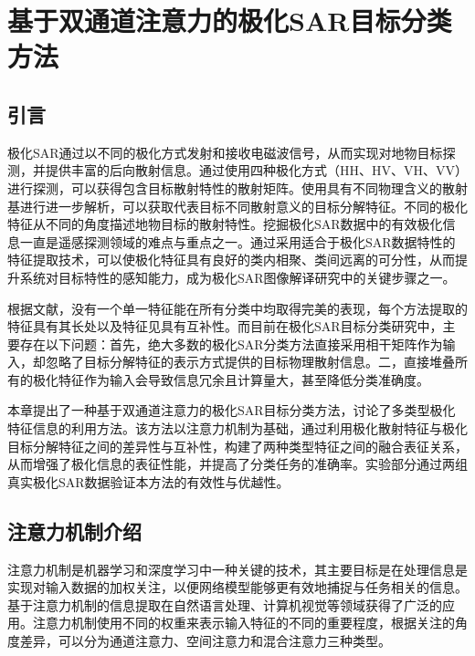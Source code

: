 \chapter{基于双通道注意力的极化SAR目标分类方法}
\section{引言}
极化SAR通过以不同的极化方式发射和接收电磁波信号，从而实现对地物目标探测，并提供丰富的后向散射信息。通过使用四种极化方式（HH、HV、VH、VV）进行探测，可以获得包含目标散射特性的散射矩阵。使用具有不同物理含义的散射基进行进一步解析，可以获取代表目标不同散射意义的目标分解特征。不同的极化特征从不同的角度描述地物目标的散射特性。挖掘极化SAR数据中的有效极化信息一直是遥感探测领域的难点与重点之一。通过采用适合于极化SAR数据特性的特征提取技术，可以使极化特征具有良好的类内相聚、类间远离的可分性，从而提升系统对目标特性的感知能力，成为极化SAR图像解译研究中的关键步骤之一。

根据文献\cite{刘高峰2014极化,1017062722.nh}，没有一个单一特征能在所有分类中均取得完美的表现，每个方法提取的特征具有其长处以及特征见具有互补性。而目前在极化SAR目标分类研究中，主要存在以下问题：首先，绝大多数的极化SAR分类方法直接采用相干矩阵作为输入，却忽略了目标分解特征的表示方式提供的目标物理散射信息。二，直接堆叠所有的极化特征作为输入会导致信息冗余且计算量大，甚至降低分类准确度。

本章提出了一种基于双通道注意力的极化SAR目标分类方法，讨论了多类型极化特征信息的利用方法。该方法以注意力机制为基础，通过利用极化散射特征与极化目标分解特征之间的差异性与互补性，构建了两种类型特征之间的融合表征关系，从而增强了极化信息的表征性能，并提高了分类任务的准确率。实验部分通过两组真实极化SAR数据验证本方法的有效性与优越性。

\section{注意力机制介绍}
\label{sec:sce3_1}
注意力机制是机器学习和深度学习中一种关键的技术，其主要目标是在处理信息是实现对输入数据的加权关注，以便网络模型能够更有效地捕捉与任务相关的信息。基于注意力机制的信息提取在自然语言处理、计算机视觉等领域获得了广泛的应用。注意力机制使用不同的权重来表示输入特征的不同的重要程度，根据关注的角度差异，可以分为通道注意力、空间注意力和混合注意力三种类型。
